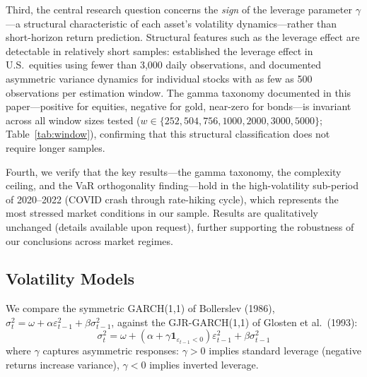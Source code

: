 Third, the central research question concerns the \textit{sign} of the leverage parameter $\gamma$---a structural characteristic of each asset's volatility dynamics---rather than short-horizon return prediction. Structural features such as the leverage effect are detectable in relatively short samples: \citet{glosten1993} established the leverage effect in U.S.\ equities using fewer than 3,000 daily observations, and \citet{engle2004} documented asymmetric variance dynamics for individual stocks with as few as 500 observations per estimation window. The gamma taxonomy documented in this paper---positive for equities, negative for gold, near-zero for bonds---is invariant across all window sizes tested ($w \in \{252, 504, 756, 1000, 2000, 3000, 5000\}$; Table~\ref{tab:window}), confirming that this structural classification does not require longer samples.

Fourth, we verify that the key results---the gamma taxonomy, the complexity ceiling, and the VaR orthogonality finding---hold in the high-volatility sub-period of 2020--2022 (COVID crash through rate-hiking cycle), which represents the most stressed market conditions in our sample. Results are qualitatively unchanged (details available upon request), further supporting the robustness of our conclusions across market regimes.

\subsection{Volatility Models}

We compare the symmetric GARCH(1,1) of Bollerslev (1986), $\sigma^2_t = \omega + \alpha \varepsilon^2_{t-1} + \beta \sigma^2_{t-1}$, against the GJR-GARCH(1,1) of Glosten et al.\ (1993):
\begin{equation}
\sigma^2_t = \omega + (\alpha + \gamma \mathbf{1}_{\varepsilon_{t-1}<0}) \varepsilon^2_{t-1} + \beta \sigma^2_{t-1}
\end{equation}
where $\gamma$ captures asymmetric responses: $\gamma > 0$ implies standard leverage (negative returns increase variance), $\gamma < 0$ implies inverted leverage.

